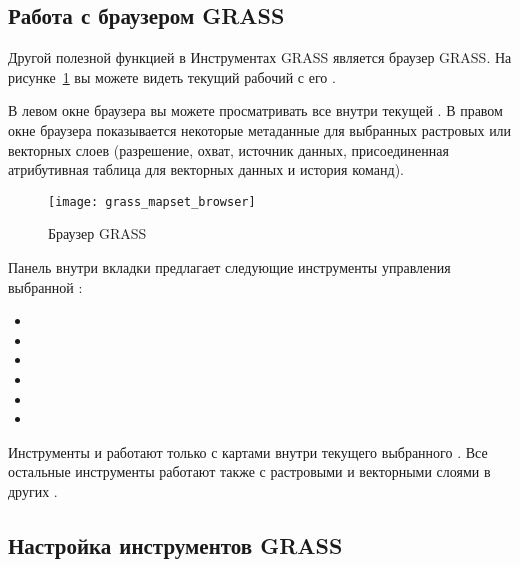 \subsection{Работа с браузером GRASS} 

Другой полезной функцией в Инструментах GRASS является браузер
 GRASS. На рисунке~\ref{fig:grass_mapset_browser} вы
можете видеть текущий рабочий  с его
.

В левом окне браузера вы можете просматривать все 
внутри текущей . В правом окне браузера показывается
некоторые метаданные для выбранных растровых или векторных слоев
(разрешение, охват, источник данных, присоединенная атрибутивная
таблица для векторных данных и история команд).

\begin{figure}[h]
 \centering
 \texttt{[image: grass\_mapset\_browser]}
 \caption{Браузер GRASS \wincaption}\label{fig:grass_mapset_browser}
\end{figure}

Панель внутри вкладки  предлагает следующие инструменты
управления выбранной :

\begin{itemize}[label=--]
\item {}
\item {}
\item {}
\item {}
\item {}
\item {}
\end{itemize}

Инструменты 
и  работают только
с картами внутри текущего выбранного . Все остальные
инструменты работают также с растровыми и векторными слоями в других
.


\subsection{Настройка инструментов GRASS} 
\label{sec:toolbox-customizing}

